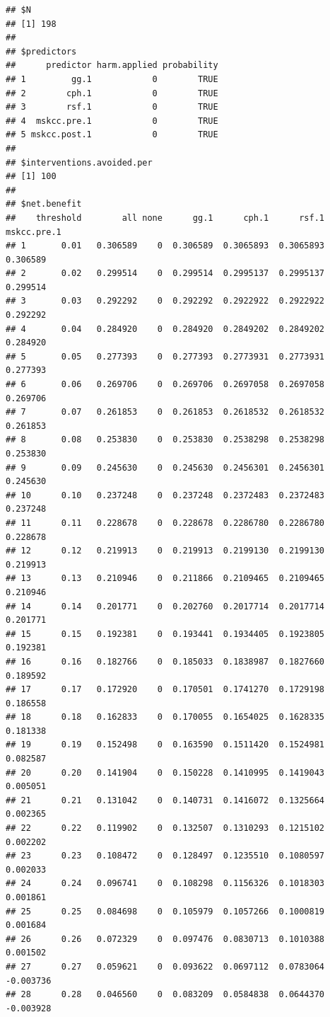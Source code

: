 \documentclass{article}\usepackage[]{graphicx}\usepackage[]{color}
\makeatletter
\newenvironment{kframe}{%
 \def\at@end@of@kframe{}%
 \ifinner\ifhmode%
  \def\at@end@of@kframe{\end{minipage}}%
  \begin{minipage}{\columnwidth}%
 \fi\fi%
 \def\FrameCommand##1{\hskip\@totalleftmargin \hskip-\fboxsep
 \colorbox{shadecolor}{##1}\hskip-\fboxsep
     \hskip-\linewidth \hskip-\@totalleftmargin \hskip\columnwidth}%
 \MakeFramed {\advance\hsize-\width
   \@totalleftmargin\z@ \linewidth\hsize
   \@setminipage}}%
 {\par\unskip\endMakeFramed%
 \at@end@of@kframe}
\newenvironment{knitrout}{}{} %
\makeatother
\begin{document}
\begin{knitrout}
\begin{kframe}\begin{verbatim}
## $N
## [1] 198
## 
## $predictors
##      predictor harm.applied probability
## 1         gg.1            0        TRUE
## 2        cph.1            0        TRUE
## 3        rsf.1            0        TRUE
## 4  mskcc.pre.1            0        TRUE
## 5 mskcc.post.1            0        TRUE
## 
## $interventions.avoided.per
## [1] 100
## 
## $net.benefit
##    threshold        all none      gg.1      cph.1      rsf.1 mskcc.pre.1
## 1       0.01   0.306589    0  0.306589  0.3065893  0.3065893    0.306589
## 2       0.02   0.299514    0  0.299514  0.2995137  0.2995137    0.299514
## 3       0.03   0.292292    0  0.292292  0.2922922  0.2922922    0.292292
## 4       0.04   0.284920    0  0.284920  0.2849202  0.2849202    0.284920
## 5       0.05   0.277393    0  0.277393  0.2773931  0.2773931    0.277393
## 6       0.06   0.269706    0  0.269706  0.2697058  0.2697058    0.269706
## 7       0.07   0.261853    0  0.261853  0.2618532  0.2618532    0.261853
## 8       0.08   0.253830    0  0.253830  0.2538298  0.2538298    0.253830
## 9       0.09   0.245630    0  0.245630  0.2456301  0.2456301    0.245630
## 10      0.10   0.237248    0  0.237248  0.2372483  0.2372483    0.237248
## 11      0.11   0.228678    0  0.228678  0.2286780  0.2286780    0.228678
## 12      0.12   0.219913    0  0.219913  0.2199130  0.2199130    0.219913
## 13      0.13   0.210946    0  0.211866  0.2109465  0.2109465    0.210946
## 14      0.14   0.201771    0  0.202760  0.2017714  0.2017714    0.201771
## 15      0.15   0.192381    0  0.193441  0.1934405  0.1923805    0.192381
## 16      0.16   0.182766    0  0.185033  0.1838987  0.1827660    0.189592
## 17      0.17   0.172920    0  0.170501  0.1741270  0.1729198    0.186558
## 18      0.18   0.162833    0  0.170055  0.1654025  0.1628335    0.181338
## 19      0.19   0.152498    0  0.163590  0.1511420  0.1524981    0.082587
## 20      0.20   0.141904    0  0.150228  0.1410995  0.1419043    0.005051
## 21      0.21   0.131042    0  0.140731  0.1416072  0.1325664    0.002365
## 22      0.22   0.119902    0  0.132507  0.1310293  0.1215102    0.002202
## 23      0.23   0.108472    0  0.128497  0.1235510  0.1080597    0.002033
## 24      0.24   0.096741    0  0.108298  0.1156326  0.1018303    0.001861
## 25      0.25   0.084698    0  0.105979  0.1057266  0.1000819    0.001684
## 26      0.26   0.072329    0  0.097476  0.0830713  0.1010388    0.001502
## 27      0.27   0.059621    0  0.093622  0.0697112  0.0783064   -0.003736
## 28      0.28   0.046560    0  0.083209  0.0584838  0.0644370   -0.003928

\end{verbatim}
\end{kframe}
\end{knitrout}
\end{document}
